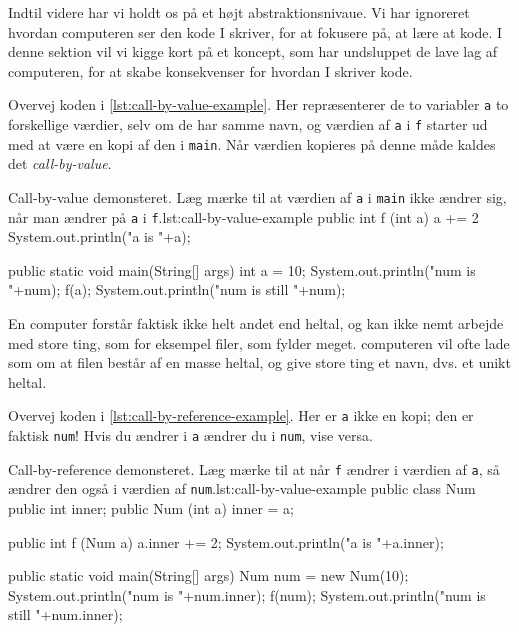
        Indtil videre har vi holdt os på et højt abstraktionsnivaue.
        Vi har ignoreret hvordan computeren ser den kode I skriver,
        for at fokusere på, at lære at kode. I denne sektion vil vi
        kigge kort på et koncept, som har undsluppet de lave lag af
        computeren, for at skabe konsekvenser for hvordan I skriver
        kode.

        Overvej koden i \autoref{lst:call-by-value-example}. Her
        repræsenterer de to variabler \texttt{a} to forskellige værdier,
        selv om de har samme navn, og værdien af \texttt{a} i \texttt{f}
        starter ud med at være en kopi af den i \texttt{main}. Når
        værdien kopieres på denne måde kaldes det
        \emph{call-by-value}.

        \begin{JavaCode}{Call-by-value demonsteret. Læg mærke til at værdien af \texttt{a} i \texttt{main} ikke ændrer sig, når man ændrer på \texttt{a} i \texttt{f}.}{lst:call-by-value-example}
            public int f (int a) {
                a += 2
                System.out.println("a is "+a);
            }

            public static void main(String[] args) {
                int a = 10;
                System.out.println("num is "+num);
                f(a);
                System.out.println("num is still "+num);
            }
        \end{JavaCode}

        En computer forstår faktisk ikke helt andet end heltal, og kan
        ikke nemt arbejde med store ting, som for eksempel filer, som
        fylder meget. computeren vil ofte lade som om at filen består
        af en masse heltal, og give store ting et navn, dvs. et unikt
        heltal.

        Overvej koden i \autoref{lst:call-by-reference-example}.
        Her er \texttt{a} ikke en kopi; den er faktisk \texttt{num}! Hvis
        du ændrer i \texttt{a} ændrer du i \texttt{num}, vise versa.

        \begin{JavaCode}{Call-by-reference demonsteret. Læg mærke til at når \texttt{f} ændrer i værdien af \texttt{a}, så ændrer den også i værdien af \texttt{num}.}{lst:call-by-value-example}
            public class Num {
                public int inner;
                public Num (int a) { inner = a; }
            }

            public int f (Num a) {
                a.inner += 2;
                System.out.println("a is "+a.inner);
            }

            public static void main(String[] args) {
                Num num = new Num(10);
                System.out.println("num is "+num.inner);
                f(num);
                System.out.println("num is still "+num.inner);
            }
        \end{JavaCode}

